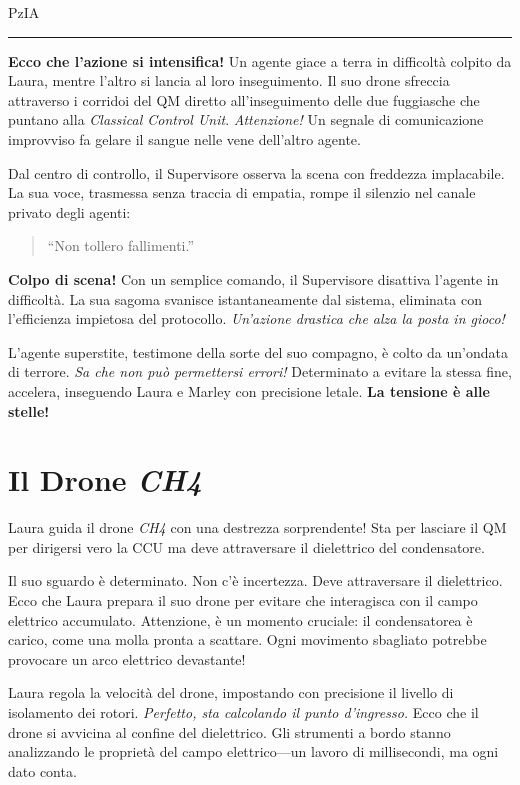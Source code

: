 \vspace{1em}
\begin{center}PzIA\end{center}
\hrule
\vspace{1em}


\textbf{Ecco che l'azione si intensifica!} Un agente giace a terra in difficoltà colpito da Laura, mentre l'altro si lancia al loro inseguimento. Il suo drone sfreccia attraverso i corridoi del QM diretto all'inseguimento delle due fuggiasche che puntano alla \textit{Classical Control Unit}. \emph{Attenzione!} Un segnale di comunicazione improvviso fa gelare il sangue nelle vene dell'altro agente.

Dal centro di controllo, il Supervisore osserva la scena con freddezza implacabile. La sua voce, trasmessa senza traccia di empatia, rompe il silenzio nel canale privato degli agenti:

\begin{quote}
\enquote{Non tollero fallimenti.}
\end{quote}

\textbf{Colpo di scena!} Con un semplice comando, il Supervisore disattiva l'agente in difficoltà. La sua sagoma svanisce istantaneamente dal sistema, eliminata con l'efficienza impietosa del protocollo. \emph{Un'azione drastica che alza la posta in gioco!}

L'agente superstite, testimone della sorte del suo compagno, è colto da un'ondata di terrore. \emph{Sa che non può permettersi errori!} Determinato a evitare la stessa fine, accelera, inseguendo Laura e Marley con precisione letale. \textbf{La tensione è alle stelle!}

\section{Il Drone \textit{CH4}}

Laura guida il drone \textit{CH4} con una destrezza sorprendente!
Sta per lasciare il QM per dirigersi vero la CCU ma deve attraversare il dielettrico del condensatore.

Il suo sguardo è determinato. Non c'è incertezza. Deve attraversare il dielettrico. Ecco che Laura prepara il suo drone per evitare che interagisca con il campo elettrico accumulato. Attenzione, è un momento cruciale: il condensatorea è carico, come una molla pronta a scattare. Ogni movimento sbagliato potrebbe provocare un arco elettrico devastante!

Laura regola la velocità del drone, impostando con precisione il livello di isolamento dei rotori. \textit{Perfetto, sta calcolando il punto d'ingresso.} Ecco che il drone si avvicina al confine del dielettrico. Gli strumenti a bordo stanno analizzando le proprietà del campo elettrico—un lavoro di millisecondi, ma ogni dato conta.

